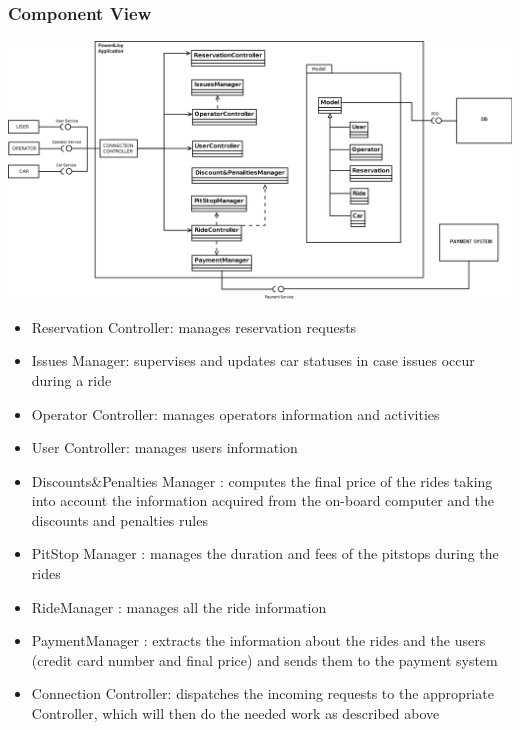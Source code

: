 \documentclass{article}
\begin{document}
\begin{flushleft}
\break
\subsubsection{Component View}
 
\vspace{0.5cm}

\includegraphics[scale=0.3]{component} 

\vspace{0.5cm}
\begin {itemize}
\item Reservation Controller: manages reservation requests
\item Issues Manager:  supervises  and updates car statuses in case issues occur during a ride
\item Operator Controller: manages operators information and activities
\item User Controller: manages users information 
\item Discounts\&Penalties Manager : computes the final price of the rides  taking into account the information acquired from the on-board computer and the discounts and penalties rules
\item PitStop Manager : manages the duration and fees of the pitstops during the rides 
\item RideManager : manages all the ride information
\item PaymentManager : extracts the information about the rides and the users (credit card number and final price) and sends them to the payment system
\item Connection Controller: dispatches the incoming requests to the appropriate Controller, which will then do the needed work as described above

\end{itemize}



\end{flushleft}
\end{document}
